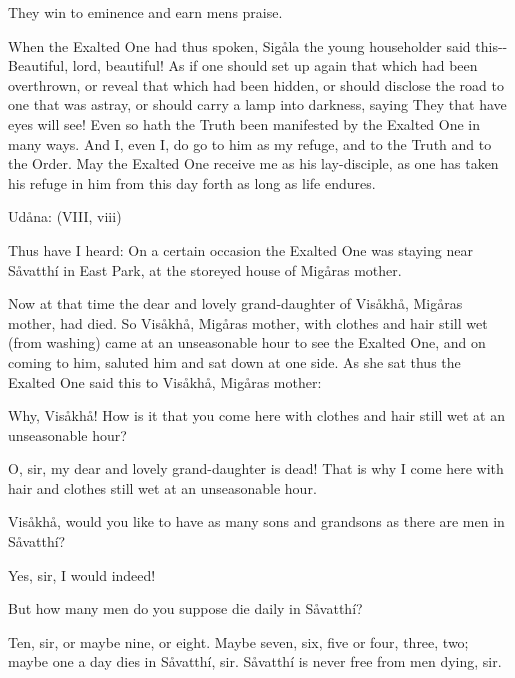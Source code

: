 \documentclass[12pt,twoside]{article}
\begin{document}
They win to eminence and earn men{\textquotesingle}s praise.


\bigskip

When the Exalted One had thus spoken, Sig{\aa}la the young householder
said this{}-{}-Beautiful, lord, beautiful! As if one should set up
again that which had been overthrown, or reveal that which had been
hidden, or should disclose the road to one that was astray, or should
carry a lamp into darkness, saying They that have eyes will see! Even
so hath the Truth been manifested by the Exalted One in many ways. And
I, even I, do go to him as my refuge, and to the Truth and to the
Order. May the Exalted One receive me as his lay{}-disciple, as one has
taken his refuge in him from this day forth as long as life endures.

\clearpage
Ud{\aa}na: (VIII, viii)


\bigskip

Thus have I heard: On a certain occasion the Exalted One was staying
near S{\aa}vatth\'i in East Park, at the storeyed house of
Mig{\aa}ra{\textquotesingle}s mother.

Now at that time the dear and lovely grand{}-daughter of
Vis{\aa}kh{\aa}, Mig{\aa}ra{\textquotesingle}s mother, had died. So
Vis{\aa}kh{\aa}, Mig{\aa}ra{\textquotesingle}s mother, with clothes and
hair still wet (from washing) came at an unseasonable hour to see the
Exalted One, and on coming to him, saluted him and sat down at one
side. As she sat thus the Exalted One said this to Vis{\aa}kh{\aa},
Mig{\aa}ra{\textquotesingle}s mother:

{\textasciigrave}Why, Vis{\aa}kh{\aa}! How is it that you come here with
clothes and hair still wet at an unseasonable hour? 

{\textasciigrave}O, sir, my dear and lovely grand{}-daughter is dead!
That is why I come here with hair and clothes still wet at an
unseasonable hour.{\textquotesingle}

Vis{\aa}kh{\aa}, would you like to have as many sons and grandsons as
there are men in S{\aa}vatth\'i?

{\textasciigrave}Yes, sir, I would indeed!{\textquotesingle}

{\textasciigrave}But how many men do you suppose die daily in
S{\aa}vatth\'i?{\textquotesingle}

{\textasciigrave}Ten, sir, or maybe nine, or eight. Maybe seven, six,
five or four, three, two; maybe one a day dies in S{\aa}vatth\'i, sir.
S{\aa}vatth\'i is never free from men dying, sir.{\textquotesingle}
\end{document}
